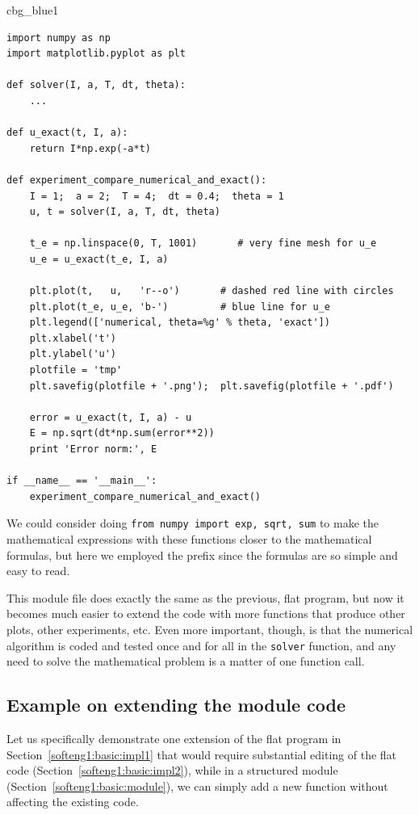 \documentclass[%
oneside,                 %
final,                   %
10pt]{article}
\newenvironment{_cod_tight}[1]{
   \def\FrameCommand{\colorbox{#1}}
   \FrameRule0.6pt\MakeFramed {\FrameRestore}\vskip3mm}
   {\vskip0mm\endMakeFramed}
\newenvironment{cod}[1]{
\bgroup\rmfamily
\fboxsep=0mm\relax
\begin{_cod_tight}{#1}
\list{}{\parsep=-2mm\parskip=0mm\topsep=0pt\leftmargin=2mm
\rightmargin=2\leftmargin\leftmargin=4pt\relax}
\item\relax}
{\endlist\end{_cod_tight}\egroup}
\begin{document}
\begin{cod}{cbg_blue1}\begin{Verbatim}[numbers=none,fontsize=\fontsize{9pt}{9pt},baselinestretch=0.95,xleftmargin=2mm]
import numpy as np
import matplotlib.pyplot as plt

def solver(I, a, T, dt, theta):
    ...

def u_exact(t, I, a):
    return I*np.exp(-a*t)

def experiment_compare_numerical_and_exact():
    I = 1;  a = 2;  T = 4;  dt = 0.4;  theta = 1
    u, t = solver(I, a, T, dt, theta)

    t_e = np.linspace(0, T, 1001)       # very fine mesh for u_e
    u_e = u_exact(t_e, I, a)

    plt.plot(t,   u,   'r--o')       # dashed red line with circles
    plt.plot(t_e, u_e, 'b-')         # blue line for u_e
    plt.legend(['numerical, theta=%g' % theta, 'exact'])
    plt.xlabel('t')
    plt.ylabel('u')
    plotfile = 'tmp'
    plt.savefig(plotfile + '.png');  plt.savefig(plotfile + '.pdf')

    error = u_exact(t, I, a) - u
    E = np.sqrt(dt*np.sum(error**2))
    print 'Error norm:', E

if __name__ == '__main__':
    experiment_compare_numerical_and_exact()
\end{Verbatim}
\end{cod}
\noindent
We could consider doing \texttt{from numpy import exp, sqrt, sum} to make
the mathematical expressions with these functions closer to the
mathematical formulas, but here we employed the prefix since the
formulas are so simple and easy to read.

This module file does exactly the same as the previous, flat program,
but now it becomes much easier to extend the code with more functions
that produce other plots, other experiments, etc. Even more important, though,
is that the numerical
algorithm is coded and tested once and for all in the \texttt{solver}
function, and any need to solve the mathematical problem is a matter
of one function call.


\subsection{Example on extending the module code}
\label{softeng1:basic:experiment2}

Let us specifically demonstrate one extension of the flat program in
Section~\ref{softeng1:basic:impl1} that would require substantial
editing of the flat code (Section~\ref{softeng1:basic:impl2}), while in
a structured module (Section~\ref{softeng1:basic:module}), we can
simply add a new function without affecting the existing code.
\end{document}
